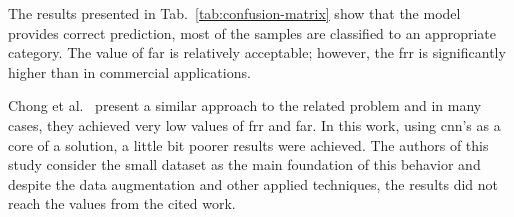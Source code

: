 The results presented in \mbox{Tab.~\ref{tab:confusion-matrix}} show that the model provides correct prediction, most of the samples are classified to an appropriate category.
The value of \gls{far} is relatively acceptable; however, the \gls{frr} is significantly higher than in commercial applications.

Chong et al.~\cite{Main} present a similar approach to the related problem and in many cases, they achieved very low values of \gls{frr} and \gls{far}.
In this work, using \gls{cnn}'s as a core of a solution, a little bit poorer results were achieved.
The authors of this study consider the small dataset as the main foundation of this behavior and despite the data augmentation and other applied techniques, the results did not reach the values from the cited work.
